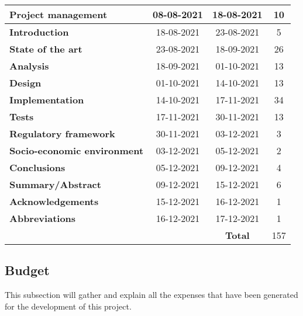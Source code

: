 \begin{longtable}[c]{lcc|c|}
	\multicolumn{1}{|l|}{\textbf{Project management}}         & \multicolumn{1}{c|}{08-08-2021} & 18-08-2021     & 10  \\ \hline
	\multicolumn{1}{|l|}{\textbf{Introduction}}               & \multicolumn{1}{c|}{18-08-2021} & 23-08-2021     & 5   \\ \hline
	\multicolumn{1}{|l|}{\textbf{State of the art}}           & \multicolumn{1}{c|}{23-08-2021} & 18-09-2021     & 26  \\ \hline
	\multicolumn{1}{|l|}{\textbf{Analysis}}                   & \multicolumn{1}{c|}{18-09-2021} & 01-10-2021     & 13  \\ \hline
	\multicolumn{1}{|l|}{\textbf{Design}}                     & \multicolumn{1}{c|}{01-10-2021} & 14-10-2021     & 13  \\ \hline
	\multicolumn{1}{|l|}{\textbf{Implementation}}             & \multicolumn{1}{c|}{14-10-2021} & 17-11-2021     & 34  \\ \hline
	\multicolumn{1}{|l|}{\textbf{Tests}}                      & \multicolumn{1}{c|}{17-11-2021} & 30-11-2021     & 13  \\ \hline
	\multicolumn{1}{|l|}{\textbf{Regulatory framework}}       & \multicolumn{1}{c|}{30-11-2021} & 03-12-2021     & 3   \\ \hline
	\multicolumn{1}{|l|}{\textbf{Socio-economic environment}} & \multicolumn{1}{c|}{03-12-2021} & 05-12-2021     & 2   \\ \hline
	\multicolumn{1}{|l|}{\textbf{Conclusions}}                & \multicolumn{1}{c|}{05-12-2021} & 09-12-2021     & 4   \\ \hline
	\multicolumn{1}{|l|}{\textbf{Summary/Abstract}}           & \multicolumn{1}{c|}{09-12-2021} & 15-12-2021     & 6   \\ \hline
	\multicolumn{1}{|l|}{\textbf{Acknowledgements}}           & \multicolumn{1}{c|}{15-12-2021} & 16-12-2021     & 1   \\ \hline
	\multicolumn{1}{|l|}{\textbf{Abbreviations}}              & \multicolumn{1}{c|}{16-12-2021} & 17-12-2021     & 1   \\ \hline
	                                                          &                                 & \textbf{Total} & 157 \\ \cline{4-4}
\end{longtable}

\subsection{Budget}\label{subsec:budget}
This subsection will gather and explain all the expenses that have been generated for the development of this project.

